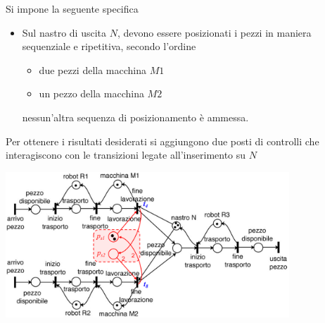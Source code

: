 \documentclass[10pt, letterpaper]{report}
\begin{document}
Si impone la seguente specifica\begin{itemize}
    \item Sul nastro di uscita $N$, devono essere posizionati i pezzi in maniera sequenziale e ripetitiva, secondo l'ordine\begin{itemize}
        \item due pezzi della macchina $M1$
        \item un pezzo della macchina $M2$
    \end{itemize}
    nessun'altra sequenza di posizionamento è ammessa.
\end{itemize}
Per ottenere i risultati desiderati si aggiungono due posti di controlli che interagiscono con le transizioni legate all'inserimento su $N$
\begin{center}
    \includegraphics[width=0.8\textwidth]{images/postiControllo.png}
\end{center}
\end{document}
